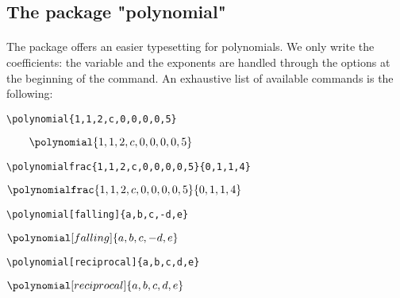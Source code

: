 \subsection{The package "polynomial"}
\paragraph*{}
The package  offers an easier typesetting for polynomials. We only write the coefficients: the variable and the exponents are handled through the options at the beginning of the command. An exhaustive list of available commands is the following:

\vspace{0cm}\begin{center}
\begin{minipage}[l]{.59\textwidth}
\begin{verbatim}
\polynomial{1,1,2,c,0,0,0,0,5}
\end{verbatim}
\end{minipage}
\begin{minipage}[r]{.39\textwidth}
$\qquad\polynomial{1,1,2,c,0,0,0,0,5}$
\end{minipage}\vspace{.5cm}

\begin{minipage}[l]{.59\textwidth}
\begin{verbatim}
\polynomialfrac{1,1,2,c,0,0,0,0,5}{0,1,1,4}
\end{verbatim}
\end{minipage}
\begin{minipage}[r]{.39\textwidth}
\qquad$\displaystyle\polynomialfrac{1,1,2,c,0,0,0,0,5}{0,1,1,4}$
\end{minipage}\vspace{.5cm}

\begin{minipage}[l]{.59\textwidth}
\begin{verbatim}	
\polynomial[falling]{a,b,c,-d,e}
\end{verbatim}
\end{minipage}
\begin{minipage}[r]{.39\textwidth}
$\polynomial[falling]{a,b,c,-d,e}$
\end{minipage}\vspace{.5cm}

\begin{minipage}[l]{.59\textwidth}
\begin{verbatim}
\polynomial[reciprocal]{a,b,c,d,e}
\end{verbatim}
\end{minipage}
\begin{minipage}[r]{.39\textwidth}
\qquad$\polynomial[reciprocal]{a,b,c,d,e}$
\end{minipage}\vspace{.5cm}


\end{center}
